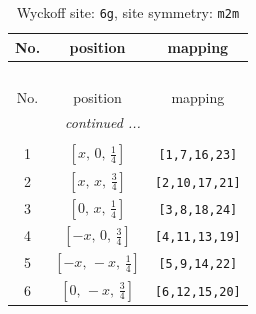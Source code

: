 \documentclass[fleqn,8pt]{jsarticle}
\begin{document}
\renewcommand{\arraystretch}{1.2}
\begin{longtable}{ccc}
\caption{Wyckoff site: {\tt 6g}, site symmetry: {\tt m2m}}
 \\
 \hline \hline
No. & position & mapping \\ \hline \endfirsthead

\multicolumn{2}{l}{\tablename\ \thetable{}} \\
 \hline \hline
No. & position & mapping \\ \hline \endhead

 \hline \hline
\multicolumn{2}{r}{\footnotesize\it continued ...} \\ \endfoot

 \hline \hline
\multicolumn{2}{r}{} \\ \endlastfoot

1 & $\left[ x,\, 0,\, \frac{1}{4} \right]$ & {\tt [1,7,16,23]} \\ \hline
2 & $\left[ x,\, x,\, \frac{3}{4} \right]$ & {\tt [2,10,17,21]} \\ \hline
3 & $\left[ 0,\, x,\, \frac{1}{4} \right]$ & {\tt [3,8,18,24]} \\ \hline
4 & $\left[ - x,\, 0,\, \frac{3}{4} \right]$ & {\tt [4,11,13,19]} \\ \hline
5 & $\left[ - x,\, - x,\, \frac{1}{4} \right]$ & {\tt [5,9,14,22]} \\ \hline
6 & $\left[ 0,\, - x,\, \frac{3}{4} \right]$ & {\tt [6,12,15,20]} \\
\end{longtable}
\renewcommand{\arraystretch}{1.2}
\end{document}

